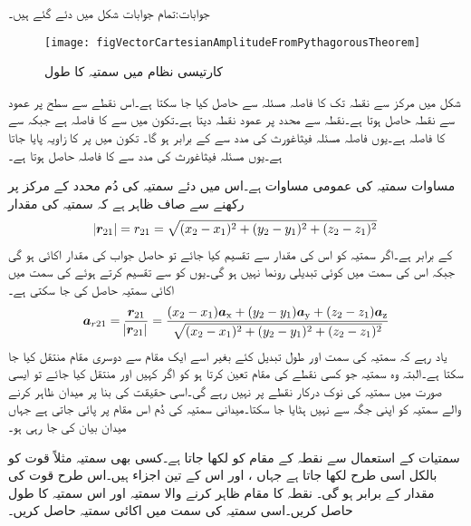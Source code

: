 جوابات:تمام جوابات شکل میں دئے گئے ہیں۔
\begin{figure}
\centering
\texttt{[image: figVectorCartesianAmplitudeFromPythagorousTheorem]}
\caption{کارتیسی نظام میں سمتیہ کا طول}
\label{شکل_سمتیہ_کارتیسی_سمتیہ_طول}
\end{figure}

شکل  میں مرکز سے نقطہ  تک کا فاصلہ  مسئلہ  سے حاصل کیا جا سکتا ہے۔اس نقطے سے  سطح پر عمود سے نقطہ  حاصل ہوتا ہے۔نقطہ  سے  محدد پر عمود نقطہ  دیتا ہے۔تکون  میں  سے  کا فاصلہ  ہے جبکہ  سے  کا فاصلہ  ہے۔یوں فاصلہ  مسئلہ فیثاغورث کی مدد سے   کے برابر ہو گا۔ تکون  میں  پر  کا زاویہ پایا جاتا ہے۔یوں مسئلہ فیثاغورث کی مدد سے  کا فاصلہ  حاصل ہوتا ہے۔

مساوات  سمتیہ کی عمومی مساوات ہے۔اس میں دئے سمتیہ  کی دُم محدد کے مرکز پر رکھنے سے صاف ظاہر ہے کہ سمتیہ کی مقدار
\begin{align}
\abs{{{\boldsymbol{r}}}_{21}}=r_{21}=\sqrt{(x_2-x_1)^2+(y_2-y_1)^2+(z_2-z_1)^2}
\end{align}
کے برابر ہے۔اگر سمتیہ کو اس کی مقدار سے تقسیم کیا جائے تو حاصل جواب کی مقدار اکائی ہو گی جبکہ اس کی سمت میں کوئی تبدیلی رونما نہیں ہو گی۔یوں   کو  سے تقسیم کرتے ہوئے  کی سمت میں اکائی سمتیہ  حاصل کی جا سکتی ہے۔
\begin{align}
{\ensuremath{{\boldsymbol{a}}}}_{r21}=\frac{{{\boldsymbol{r}}}_{21}}{\abs{{{\boldsymbol{r}}}_{21}}}=\frac{(x_2-x_1) {\boldsymbol{a}}_{\textup{x}}+(y_2-y_1){\boldsymbol{a}}_{\textup{y}}+(z_2-z_1){\boldsymbol{a}}_{\textup{z}}}{\sqrt{(x_2-x_1)^2+(y_2-y_1)^2+(z_2-z_1)^2}}
\end{align}
یاد رہے کہ سمتیہ کی سمت اور طول تبدیل کئے بغیر اسے ایک مقام سے دوسری مقام منتقل کیا جا سکتا ہے۔البتہ وہ سمتیہ جو کسی نقطے کی مقام تعین کرتا ہو کو اگر کہیں اور منتقل کیا جائے تو ایسی صورت میں  سمتیہ کی نوک درکار نقطے پر نہیں رہے گی۔اسی حقیقت کی بنا پر میدان ظاہر کرنے والے سمتیہ کو اپنی جگہ سے نہیں ہٹایا جا سکتا۔میدانی سمتیہ کی دُم اس مقام پر پائی جاتی ہے جہاں میدان بیان کی جا رہی ہو۔

سمتیات کے استعمال سے نقطہ  کے مقام کو  لکھا جاتا ہے۔کسی بھی سمتیہ مثلاً قوت  کو بالکل اسی طرح   لکھا جاتا ہے جہاں ،  اور  اس کے تین اجزاء ہیں۔اس طرح قوت کی مقدار   کے برابر ہو گی۔
نقطہ   کا مقام ظاہر کرنے والا سمتیہ اور اس سمتیہ کا طول حاصل کریں۔اسی سمتیہ کی سمت میں اکائی سمتیہ حاصل کریں۔

